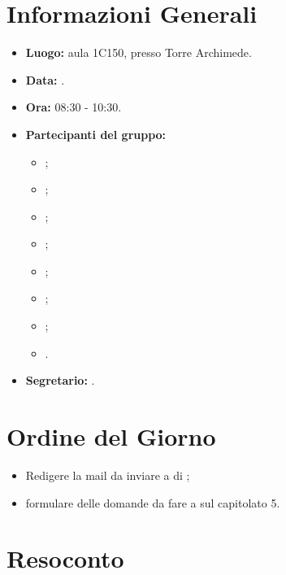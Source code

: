 \section{Informazioni Generali}
\begin{itemize}
\item \textbf{Luogo:} aula 1C150, presso Torre Archimede.
\item \textbf{Data:} \Data.
\item \textbf{Ora:} 08:30 - 10:30.
\item \textbf{Partecipanti del gruppo:}
	\begin{itemize}
		\item \AT{}; 
		\item \BR{};
		\item \CE{}; 
		\item \DF{};
		\item \LD{};
		\item \MC{};
		\item \PF{};
		\item \SE{}.
	\end{itemize} 
\item \textbf{Segretario:} \PF{}.
\end{itemize}

\section{Ordine del Giorno}
\begin{itemize}
	\item Redigere la mail da inviare a \ZD{} di \Proponente{};
	\item formulare delle domande da fare a \ZD{} sul capitolato 5.
\end{itemize}

\section{Resoconto}
